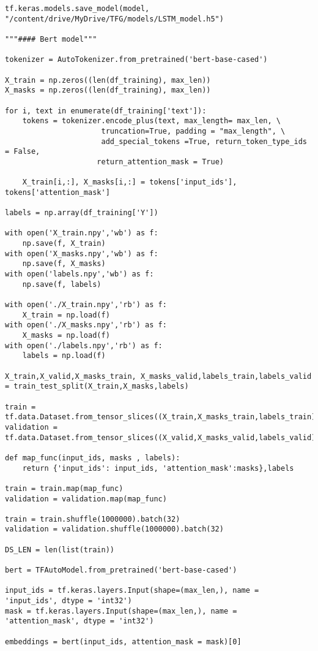 \documentclass[10pt,riqno,a4paper,twoside]{article}\usepackage[]{graphicx}\usepackage[]{color}
\begin{document}
\begin{lstlisting}
tf.keras.models.save_model(model, "/content/drive/MyDrive/TFG/models/LSTM_model.h5")

"""#### Bert model"""

tokenizer = AutoTokenizer.from_pretrained('bert-base-cased')

X_train = np.zeros((len(df_training), max_len))
X_masks = np.zeros((len(df_training), max_len))

for i, text in enumerate(df_training['text']):
    tokens = tokenizer.encode_plus(text, max_length= max_len, \
                      truncation=True, padding = "max_length", \
                      add_special_tokens =True, return_token_type_ids = False,
                     return_attention_mask = True)
    
    X_train[i,:], X_masks[i,:] = tokens['input_ids'], tokens['attention_mask']

labels = np.array(df_training['Y'])

with open('X_train.npy','wb') as f:
    np.save(f, X_train)
with open('X_masks.npy','wb') as f:
    np.save(f, X_masks)
with open('labels.npy','wb') as f:
    np.save(f, labels)

with open('./X_train.npy','rb') as f:
    X_train = np.load(f)
with open('./X_masks.npy','rb') as f:
    X_masks = np.load(f)
with open('./labels.npy','rb') as f:
    labels = np.load(f)

X_train,X_valid,X_masks_train, X_masks_valid,labels_train,labels_valid = train_test_split(X_train,X_masks,labels)

train = tf.data.Dataset.from_tensor_slices((X_train,X_masks_train,labels_train))
validation = tf.data.Dataset.from_tensor_slices((X_valid,X_masks_valid,labels_valid))

def map_func(input_ids, masks , labels):
    return {'input_ids': input_ids, 'attention_mask':masks},labels

train = train.map(map_func)
validation = validation.map(map_func)

train = train.shuffle(1000000).batch(32)
validation = validation.shuffle(1000000).batch(32)

DS_LEN = len(list(train))

bert = TFAutoModel.from_pretrained('bert-base-cased')

input_ids = tf.keras.layers.Input(shape=(max_len,), name = 'input_ids', dtype = 'int32')
mask = tf.keras.layers.Input(shape=(max_len,), name = 'attention_mask', dtype = 'int32')

embeddings = bert(input_ids, attention_mask = mask)[0]


\end{lstlisting}
\end{document}
